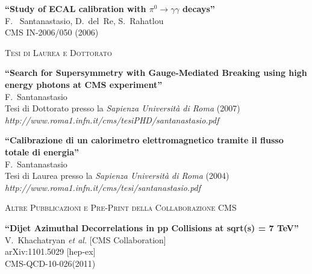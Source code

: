 \documentclass[10pt, a4paper]{article}
\begin{document}
\begin{thebibliography}{599}
{\bf ``Study of ECAL calibration with $\pi^0 \rightarrow \gamma \gamma$ decays''}
  \\{}F. ~Santanastasio, D.~del~Re, S.~Rahatlou
  \\{}CMS IN-2006/050 (2006)

\vspace{0.1cm} \begin{center} \textsc{Tesi di Laurea e Dottorato} \end{center} \vspace{0.05cm}

{\bf ``Search for Supersymmetry with Gauge-Mediated Breaking using high energy photons at CMS experiment''}
  \\{}F.~Santanastasio
  \\{}Tesi di Dottorato presso la \textit{Sapienza Universit\`a di Roma} (2007)
\\{}{\it http://www.roma1.infn.it/cms/tesiPHD/santanastasio.pdf}

{\bf ``Calibrazione di un calorimetro elettromagnetico tramite il flusso totale di energia''}
  \\{}F.~Santanastasio
  \\{}Tesi di Laurea presso la \textit{Sapienza Universit\`a di Roma} (2004)
\\{}{\it http://www.roma1.infn.it/cms/tesi/santanastasio.pdf }


\vspace{0.1cm} \begin{center} \textsc{Altre Pubblicazioni e Pre-Print della Collaborazione CMS} \end{center} \vspace{0.05cm}

{\bf ``Dijet Azimuthal Decorrelations in pp Collisions at sqrt(s) = 7 TeV''}
  \\{}V.~Khachatryan {\it et al.}  [CMS Collaboration]
  \\{}arXiv:1101.5029 [hep-ex]
\\{}CMS-QCD-10-026(2011)


\end{thebibliography}
\end{document}
